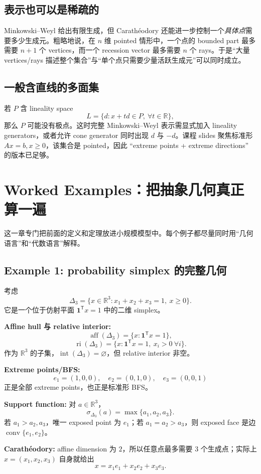 \documentclass[11pt,a4paper,openany]{ctexrep}
\theoremstyle{definition}
\newcommand{\R}{\mathbb{R}}
\newcommand{\interior}{\operatorname{int}}
\newcommand{\ri}{\operatorname{ri}}
\newcommand{\aff}{\operatorname{aff}}
\newcommand{\conv}{\operatorname{conv}}
\newcommand{\transpose}{\mathsf{T}}
\begin{document}
\section{表示也可以是稀疏的}
Minkowski--Weyl 给出有限生成，但 Carath\'eodory 还能进一步控制一个\emph{具体点}需要多少生成元。粗略地说，在 $n$ 维 pointed 情形中，一个点的 bounded part 最多需要 $n+1$ 个 vertices，而一个 recession vector 最多需要 $n$ 个 rays。于是“大量 vertices/rays 描述整个集合”与“单个点只需要少量活跃生成元”可以同时成立。

\section{一般含直线的多面集}
若 $P$ 含 lineality space
\[
L=\{d:x+td\in P,\ \forall t\in\R\},
\]
那么 $P$ 可能没有极点。这时完整 Minkowski--Weyl 表示需显式加入 lineality generators，或者允许 cone generator 同时出现 $d$ 与 $-d$。课程 slides 聚焦标准形 $Ax=b,x\ge0$，该集合是 pointed，因此 ``extreme points + extreme directions'' 的版本已足够。

\chapter{Worked Examples：把抽象几何真正算一遍}

这一章专门把前面的定义和定理放进小规模模型中。每个例子都尽量同时用“几何语言”和“代数语言”解释。

\section{Example 1: probability simplex 的完整几何}
考虑
\[
\Delta_3=\{x\in\R^3:x_1+x_2+x_3=1,\ x\ge0\}.
\]
它是一个位于仿射平面 $\mathbf1^\transpose x=1$ 中的二维 simplex。

\textbf{Affine hull 与 relative interior:}
\[
\aff(\Delta_3)=\{x:\mathbf1^\transpose x=1\},
\]
\[
\ri(\Delta_3)=\{x:\mathbf1^\transpose x=1,\ x_i>0\ \forall i\}.
\]
作为 $\R^3$ 的子集，$\interior(\Delta_3)=\varnothing$，但 relative interior 非空。

\textbf{Extreme points/BFS:}
\[
e_1=(1,0,0),\quad e_2=(0,1,0),\quad e_3=(0,0,1)
\]
正是全部 extreme points，也正是标准形 BFS。

\textbf{Support function:}
对 $a\in\R^3$，
\[
\sigma_{\Delta_3}(a)=\max\{a_1,a_2,a_3\}.
\]
若 $a_1>a_2,a_3$，唯一 exposed point 为 $e_1$；若 $a_1=a_2>a_3$，则 exposed face 是边 $\conv\{e_1,e_2\}$。

\textbf{Carath\'eodory:} affine dimension 为 $2$，所以任意点最多需要 $3$ 个生成点；实际上 $x=(x_1,x_2,x_3)$ 自身就给出
\[
x=x_1e_1+x_2e_2+x_3e_3.
\]
\end{document}
